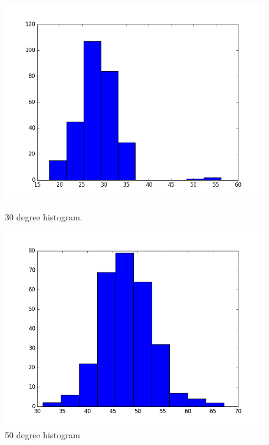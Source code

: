 \documentclass[12pt]{article}
\numberwithin{figure}{section}
\numberwithin{table}{section}
\begin{document}
\begin{figure}[H]
  \centering
  \begin{minipage}[b]{0.4\textwidth}
    \includegraphics[width=\textwidth]{figure30.png}
    \caption{30 degree histogram.}
  \end{minipage}
  \hfill
  \begin{minipage}[b]{0.4\textwidth}
    \includegraphics[width=\textwidth]{figure50.png}
    \caption{50 degree histogram}
  \end{minipage}
\end{figure}
\end{document}
